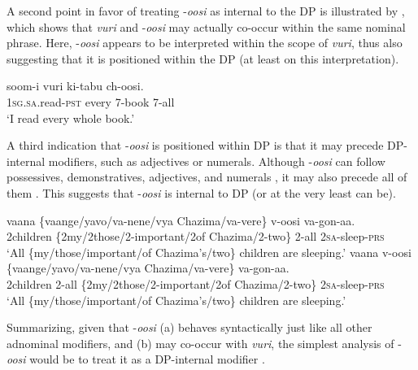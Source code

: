 \documentclass[output=paper]{langsci/langscibook}
\begin{document}
A second point in favor of treating -\textit{oosi} as internal to the DP is illustrated by , which shows that \textit{vuri} and -\textit{oosi} may actually co-occur within the same nominal phrase. Here, -\textit{oosi} appears to be interpreted within the scope of \textit{vuri}, thus also suggesting that it is positioned within the DP (at least on this interpretation).

\ea\label{ex:landman:24}
\gll soom-i      vuri    ki-tabu  ch-oosi.\\
     1\textsc{sg.sa}.read-\textsc{pst}  every    7-book  7-all \\
\glt ‘I read every whole book.’
\z

A third indication that -\textit{oosi} is positioned within DP is that it may precede DP-internal modifiers, such as adjectives or numerals. Although -\textit{oosi} can follow possessives, demonstratives, adjectives, and numerals , it may also precede all of them . This suggests that -\textit{oosi} is internal to DP (or at the very least can be). 

\ea\label{ex:landman:25} 
\ea\label{ex:landman:25a} 
\gll vaana    \textup{\{}vaange\textup{/}yavo\textup{/}va-nene/vya Chazima/va-vere\}  v-oosi  va-gon-aa.\\
     2children        \{2my/2those/2-important/2of Chazima/2-two\}                    2-all  2\textsc{sa}-sleep-\textsc{prs}\\
\glt `All \{my/those/important/of Chazima's/two\} children are sleeping.'  
\ex\label{ex:landman:25b}
\gll vaana      v-oosi \textup{\{}vaange\textup{/}yavo\textup{/}va-nene/vya Chazima/va-vere\}  va-gon-aa.\\
     2children  2-all          \{2my/2those/2-important/2of                 Chazima/2-two\}    2\textsc{sa}-sleep-\textsc{prs}\\
\glt     `All \{my/those/important/of Chazima's/two\} children are sleeping.'  \\
\z
\z

  Summarizing, given that -\textit{oosi} (a) behaves syntactically just like all other adnominal modifiers, and (b) may co-occur with \textit{vuri}, the simplest analysis of -\textit{oosi} would be to treat it as a DP-internal modifier .
\end{document}
